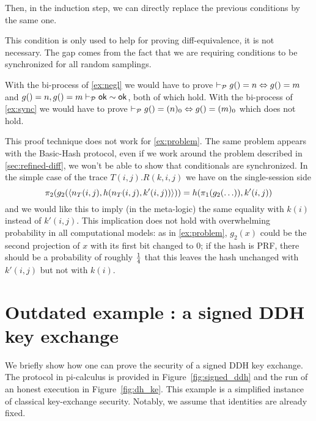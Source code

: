 Then, in the induction step, we can directly replace the previous conditions by the same one.


This condition is only used to help for proving diff-equivalence, it is not necessary.
The gap comes from the fact that we are requiring conditions to be
synchronized for all random samplings.

\begin{example}
  With the bi-process of \cref{ex:negl} we would have to prove
  $\vdash_{\mathcal{P}} g() = n \Leftrightarrow g() = m$ and
  $g()=n, g()=m \vdash_{\mathcal{P}} \mathsf{ok} \sim \mathsf{ok}$, both of which hold.
  With the bi-process of \cref{ex:sync} we would have to prove
  $\vdash_{\mathcal{P}} g() = (n)_0 \Leftrightarrow g() = (m)_0$ which does not hold.
\end{example}

\begin{example} \label{ex:indep}
  This proof technique does not work for \cref{ex:problem}.
  The same problem appears with the Basic-Hash protocol, even if we work around
  the problem described in \cref{sec:refined-diff}, we won't be able to show
  that conditionals are synchronized.  In the simple case of the trace
  $T(i,j).R(k,i,j)$ we have
  on the single-session side
  $$\pi_2(g_2(\langle n_T(i,j),h(n_T(i,j),k'(i,j)) \rangle)) =
  h(\pi_1(g_2(\ldots)),k'(i,j))$$
  and we would like this to imply (in the meta-logic)
  the same equality with $k(i)$ instead of $k'(i,j)$.
  This implication does not hold with overwhelming probability in all
  computational models: as in \cref{ex:problem}, $g_2(x)$ could be the second
  projection of $x$ with its first bit changed to $0$; if the hash is PRF,
  there should be a probability of roughly $1 \over 4$ that this leaves
  the hash unchanged with $k'(i,j)$ but not with $k(i)$.
\end{example}

\section{Outdated example : a signed DDH key exchange}

We briefly show how one can prove the security of a signed DDH key exchange. The protocol in pi-calculus is provided in Figure~\ref{fig:signed_ddh} and the run of an honest execution in Figure~\ref{fig:dh_ke}. This example is a simplified instance of classical key-exchange security. Notably, we assume that identities are already fixed.

